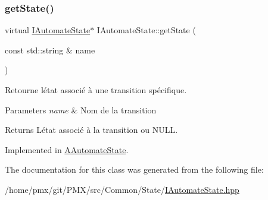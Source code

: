 \subsubsection{\texorpdfstring{get\+State()}{getState()}}
{\footnotesize\ttfamily virtual \hyperlink{classIAutomateState}{I\+Automate\+State}$\ast$ I\+Automate\+State\+::get\+State (\begin{DoxyParamCaption}\item[{const std\+::string \&}]{name }\end{DoxyParamCaption})\hspace{0.3cm}{\ttfamily [pure virtual]}}



Retourne l\textquotesingle{}état associé à une transition spécifique. 


\begin{DoxyParams}{Parameters}
{\em name} & Nom de la transition \\
\hline
\end{DoxyParams}
\begin{DoxyReturn}{Returns}
L\textquotesingle{}état associé à la transition ou {\ttfamily N\+U\+LL}. 
\end{DoxyReturn}


Implemented in \hyperlink{classAAutomateState_a98966c27660941825dba0da7130a957f}{A\+Automate\+State}.



The documentation for this class was generated from the following file\+:\begin{DoxyCompactItemize}
\item 
/home/pmx/git/\+P\+M\+X/src/\+Common/\+State/\hyperlink{IAutomateState_8hpp}{I\+Automate\+State.\+hpp}\end{DoxyCompactItemize}
